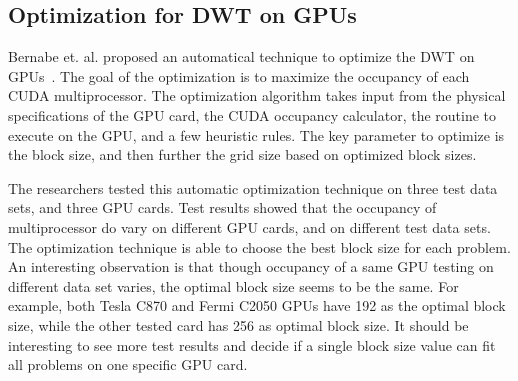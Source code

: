 \subsection{Optimization for DWT on GPUs}
\label{sec:optimize}
%
Bernabe et. al. proposed an automatical technique to optimize the DWT on 
GPUs~\cite{bernabe2013optimization}.
%
The goal of the optimization is to maximize the occupancy of each CUDA 
multiprocessor.
%
The optimization algorithm takes input from the physical specifications 
of the GPU card, the CUDA occupancy calculator, the routine to execute
on the GPU, and a few heuristic rules.
%
The key parameter to optimize is the block size, and then further the 
grid size based on optimized block sizes.


The researchers tested this automatic optimization technique on three
test data sets, and three GPU cards.
%
Test results showed that the occupancy of multiprocessor do vary on 
different GPU cards, and on different test data sets.
%
The optimization technique is able to choose the best block size for 
each problem.
%
An interesting observation is that though occupancy of a same GPU 
testing on different data set varies, the optimal block size seems
to be the same. 
%
For example, both Tesla C870 and Fermi C2050 GPUs have 192 as the optimal
block size, while the other tested card has 256 as optimal block size.
%
It should be interesting to see more test results and decide if a single 
block size value can fit all problems on one specific GPU card.



